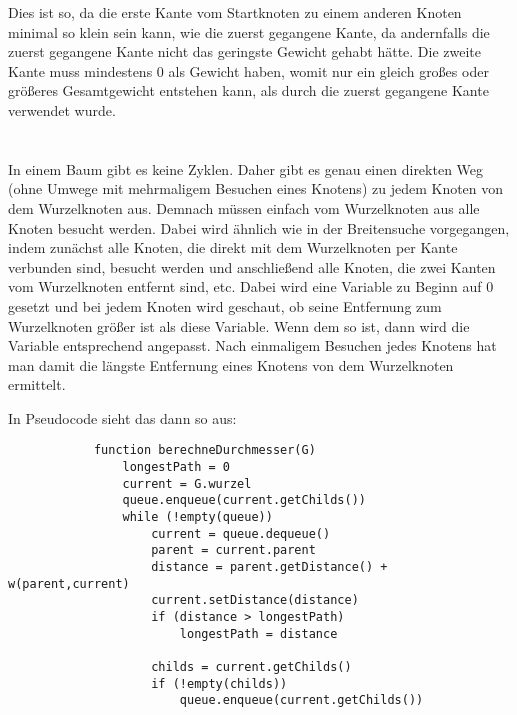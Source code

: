 \documentclass[10pt,a4paper,oneside,ngerman,numbers=noenddot]{scrartcl}
\begin{document}
	Dies ist so, da die erste Kante vom Startknoten zu einem anderen Knoten minimal so klein sein kann, wie die zuerst gegangene Kante, da andernfalls die zuerst gegangene Kante nicht das geringste Gewicht gehabt hätte. Die zweite Kante muss mindestens 0 als Gewicht haben, womit nur ein gleich großes oder größeres Gesamtgewicht entstehen kann, als durch die zuerst gegangene Kante verwendet wurde.
\section{} %
	\subsection{} %
		In einem Baum gibt es keine Zyklen. Daher gibt es genau einen direkten Weg (ohne Umwege mit mehrmaligem Besuchen eines Knotens) zu jedem Knoten von dem Wurzelknoten aus. Demnach müssen einfach vom Wurzelknoten aus alle Knoten besucht werden. Dabei wird ähnlich wie in der Breitensuche vorgegangen, indem zunächst alle Knoten, die direkt mit dem Wurzelknoten per Kante verbunden sind, besucht werden und anschließend alle Knoten, die zwei Kanten vom Wurzelknoten entfernt sind, etc. Dabei wird eine Variable zu Beginn auf 0 gesetzt und bei jedem Knoten wird geschaut, ob seine Entfernung zum Wurzelknoten größer ist als diese Variable. Wenn dem so ist, dann wird die Variable entsprechend angepasst. Nach einmaligem Besuchen jedes Knotens hat man damit die längste Entfernung eines Knotens von dem Wurzelknoten ermittelt.
		
		In Pseudocode sieht das dann so aus:
		
		\begin{verbatim}
		    function berechneDurchmesser(G)
		        longestPath = 0
		        current = G.wurzel
		        queue.enqueue(current.getChilds())
		        while (!empty(queue))
		            current = queue.dequeue()
		   	        parent = current.parent
		   	        distance = parent.getDistance() + w(parent,current)
		   	        current.setDistance(distance)
		            if (distance > longestPath)
		                longestPath = distance
		            
		            childs = current.getChilds()
		            if (!empty(childs))
		                queue.enqueue(current.getChilds())
		\end{verbatim}
	\subsection{} %
		
\end{document}

